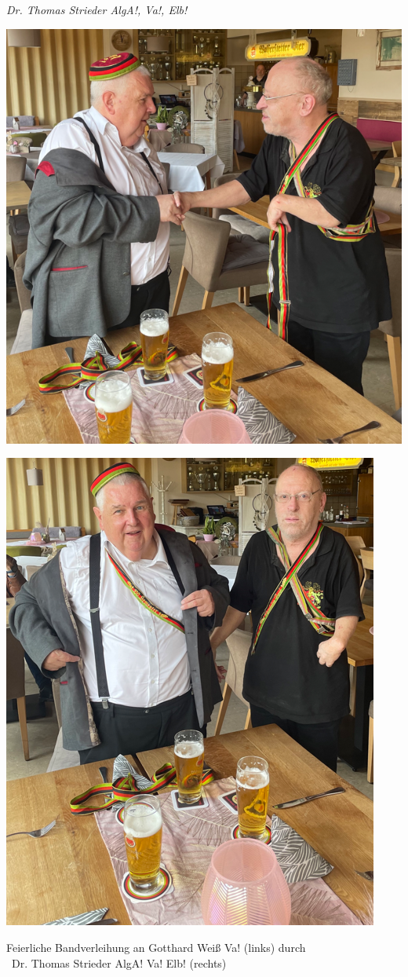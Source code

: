 \begin{multicols}{2}
	\begin{flushright}
		\hfill\emph{Dr. Thomas Strieder AlgA!, Va!, Elb!}
	\end{flushright}

\end{multicols}

\begin{center}
\begin{figurehere}
		\includegraphics[width=.55\linewidth]{./Bilder/1.4.100Semesterband/2.bild.png} 
\end{figurehere}

\begin{figurehere}
  \includegraphics[width=.55\linewidth]{./Bilder/1.4.100Semesterband/1.bild.png} 
  \captionsetup{justification=centering,margin=2cm}
  \caption{Feierliche Bandverleihung an Gotthard Weiß Va! (links) durch\\ ~Dr. Thomas Strieder AlgA! Va! Elb! (rechts)}
\end{figurehere}
\end{center}


%
